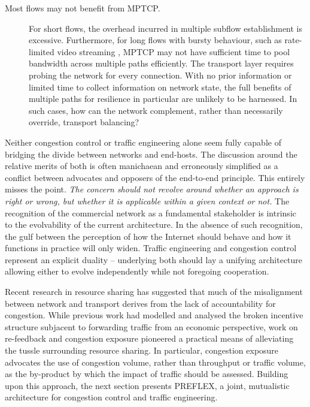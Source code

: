 \begin{description}
\item[Most flows may not benefit from \ac{MPTCP}.]{
    For short flows, the overhead incurred in multiple subflow establishment is excessive.
    Furthermore, for long flows with bursty behaviour, such as rate-limited video streaming \cite{Rao:2011p547}, \ac{MPTCP} may not have sufficient time to pool bandwidth across multiple paths efficiently.
    The transport layer requires probing the network for every connection. 
    With no prior information or limited time to collect information on network state, the full benefits of multiple paths for resilience in particular are unlikely to be harnessed.
    In such cases, how can the network complement, rather than necessarily override, transport balancing?
}

\end{description}

Neither congestion control or traffic engineering alone seem fully capable of bridging the divide between networks and end-hosts. 
The discussion around the relative merits of both is often manichaean and erroneously simplified as a conflict between advocates and opposers of the end-to-end principle. 
This entirely misses the point.
\textit{The concern should not revolve around whether an approach is right or wrong, but whether it is applicable within a given context or not.}
The recognition of the commercial network as a fundamental stakeholder is intrinsic to the evolvability of the current architecture. 
In the absence of such recognition, the gulf between the perception of how the Internet should behave and how it functions in practice will only widen. 
Traffic engineering and congestion control represent an explicit duality -- underlying both should lay a unifying architecture allowing either to evolve independently while not foregoing cooperation.

Recent research in resource sharing has suggested that much of the misalignment between network and transport derives from the lack of accountability for congestion.
While previous work had modelled and analysed the broken incentive structure subjacent to forwarding traffic from an economic perspective, work on re-feedback and congestion exposure \cite{Briscoe:2005p346} pioneered a practical means of alleviating the tussle surrounding resource sharing.  
In particular, congestion exposure advocates the use of congestion volume, rather than throughput or traffic volume, as the by-product by which the impact of traffic should be assessed.  
Building upon this approach, the next section presents PREFLEX, a joint, mutualistic architecture for congestion control and traffic engineering. 

